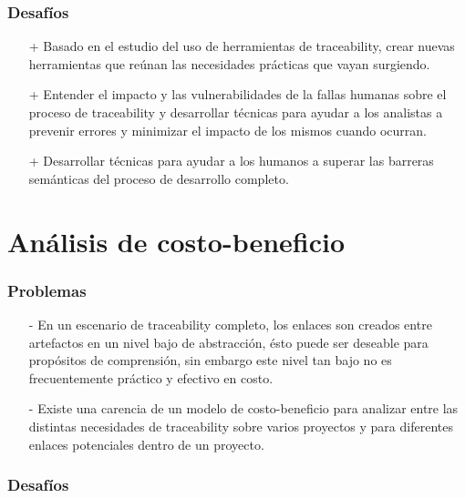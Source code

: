 \documentclass[a4paper,12pt,oneside,spanish]{book}
\begin{document}
\subsubsection{Desafíos}

\begin{itemize}

\item[+] Basado en el estudio del uso de herramientas de traceability, crear nuevas herramientas que reúnan las necesidades prácticas que vayan surgiendo.

\item[+] Entender el impacto y las vulnerabilidades de la fallas humanas sobre el proceso de traceability y desarrollar técnicas para ayudar a los analistas a prevenir errores y minimizar el impacto de los mismos cuando ocurran.

\item[+] Desarrollar técnicas para ayudar a los humanos a superar las barreras semánticas del proceso de desarrollo completo.

\end{itemize}

\section{Análisis de costo-beneficio}

\subsubsection{Problemas}

\begin{itemize}

\item[-] En un escenario de traceability completo, los enlaces son creados entre artefactos en un nivel bajo de abstracción, ésto puede ser deseable para propósitos de comprensión, sin embargo este nivel tan bajo no es frecuentemente práctico y efectivo en costo.

\item[-] Existe una carencia de un modelo de costo-beneficio para analizar entre las distintas necesidades de traceability sobre varios proyectos y para diferentes enlaces potenciales dentro de un proyecto.

\end{itemize}

\subsubsection{Desafíos}
\end{document}
